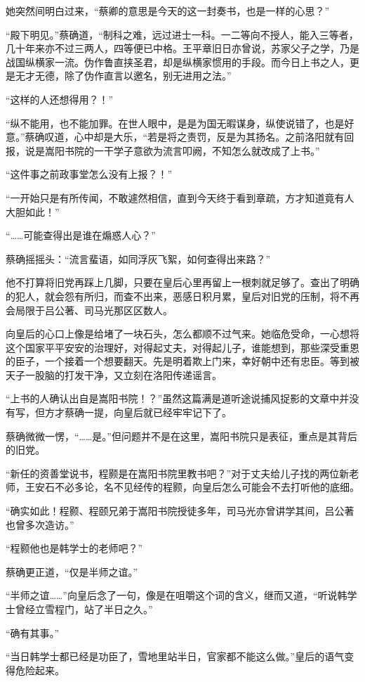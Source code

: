 她突然间明白过来，“蔡卿的意思是今天的这一封奏书，也是一样的心思？”

“殿下明见。”蔡确道，“制科之难，远过进士一科。一二等向不授人，能入三等者，几十年来亦不过三两人，四等便已中格。王平章旧日亦曾说，苏家父子之学，乃是战国纵横家一流。伪作鲁直挟圣君，却是纵横家惯用的手段。而今日上书之人，更是无才无德，除了伪作直言以邀名，别无进用之法。”

“这样的人还想得用？！”

“纵不能用，也不能加罪。在世人眼中，是是为国无暇谋身，纵使说错了，也是好意。”蔡确叹道，心中却是大乐，“若是将之责罚，反是为其扬名。之前洛阳就有回报，说是嵩阳书院的一干学子意欲为流言叩阙，不知怎么就改成了上书。”

“这件事之前政事堂怎么没有上报？！”

“一开始只是有所传闻，不敢遽然相信，直到今天终于看到章疏，方才知道竟有人大胆如此！”

“……可能查得出是谁在煽惑人心？”

蔡确摇摇头：“流言蜚语，如同浮灰飞絮，如何查得出来路？”

他不打算将旧党再踩上几脚，只要在皇后心里再留上一根刺就足够了。查出了明确的犯人，就会怨有所归，而查不出来，恶感日积月累，皇后对旧党的压制，将不再会局限于吕公著、司马光那区区数人。

向皇后的心口上像是给堵了一块石头，怎么都顺不过气来。她临危受命，一心想将这个国家平平安安的治理好，对得起丈夫，对得起儿子，谁能想到，那些深受重恩的臣子，一个接着一个想要翻天。先是明着欺上门来，幸好朝中还有忠臣。等到被天子一股脑的打发干净，又立刻在洛阳传递谣言。

“上书的人确认出自是嵩阳书院！？”虽然这篇满是道听途说捕风捉影的文章中并没有写，但方才蔡确一提，向皇后就已经牢牢记下了。

蔡确微微一愣，“……是。”但问题并不是在这里，嵩阳书院只是表征，重点是其背后的旧党。

“新任的资善堂说书，程颢是在嵩阳书院里教书吧？”对于丈夫给儿子找的两位新老师，王安石不必多论，名不见经传的程颢，向皇后怎么可能会不去打听他的底细。

“确实如此！程颢、程颐兄弟于嵩阳书院授徒多年，司马光亦曾讲学其间，吕公著也曾多次造访。”

“程颢他也是韩学士的老师吧？”

蔡确更正道，“仅是半师之谊。”

“半师之谊……”向皇后念了一句，像是在咀嚼这个词的含义，继而又道，“听说韩学士曾经立雪程门，站了半日之久。”

“确有其事。”

“当日韩学士都已经是功臣了，雪地里站半日，官家都不能这么做。”皇后的语气变得危险起来。

